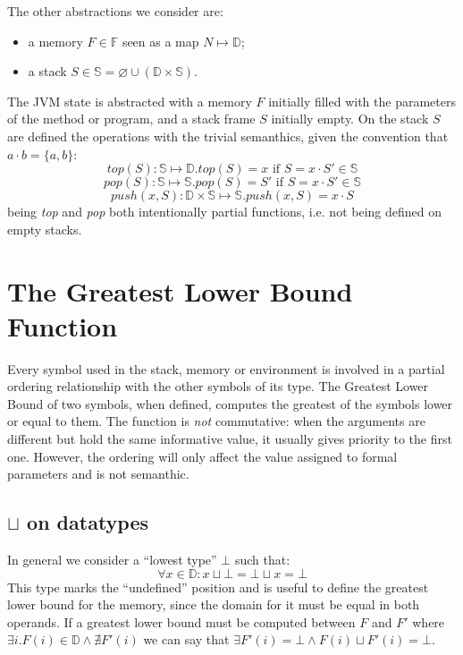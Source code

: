 \documentclass{amsart}
\newcommand{\bF}{\mathbb{F}}
\newcommand{\bS}{\mathbb{S}}
\newcommand{\data}{\mathbb{D}}
\renewcommand{\emptyset}{\varnothing}
\numberwithin{equation}{section}
\theoremstyle{plain} %
\theoremstyle{definition}
\theoremstyle{remark}
\begin{document}
The other abstractions we consider are:
\begin{itemize}
\item a memory $F \in \bF{}$ seen as a map $N \mapsto \data{}$;
\item a stack $S \in \bS{} = \emptyset \cup (\data{} \times \bS{})$. 
\end{itemize}
The JVM state is abstracted with a memory $F$ initially filled with the parameters of the method or program, and a stack frame $S$ initially empty. On the stack $S$ are defined the operations with the trivial semanthics, given the convention that $a\cdot b = \{a, b\} $:
\[
top(S): \bS{} \mapsto \data{}.top(S) = x \text{ if } S = x \cdot S' \in \bS{}
\]\[pop(S): \bS{} \mapsto \bS{}.pop(S) = S' \text{ if } S = x \cdot S' \in \bS{}
\]\[push(x, S): \data{} \times \bS{} \mapsto \bS{}.push(x, S) = x \cdot S
\]
being \emph{top} and \emph{pop} both intentionally partial functions, i.e. not being defined on empty stacks.\\


\section{The Greatest Lower Bound Function}

Every symbol used in the stack, memory or environment is involved in a partial ordering relationship with the other symbols of its type. The Greatest Lower Bound of two symbols, when defined, computes the greatest of the symbols lower or equal to them. The function is \emph{not} commutative: when the arguments are different but hold the same informative value, it usually gives priority to the first one. However, the ordering will only affect the value assigned to formal parameters and is not semanthic.

\subsection{$\sqcup$ on datatypes}
In general we consider a ``lowest type'' $\bot$ such that:
\[ \forall x \in \data{}: x \sqcup \bot = \bot \sqcup x = \bot \]
This type marks the ``undefined'' position and is useful to define the greatest lower bound for the memory, since the domain for it must be equal in both operands. If a greatest lower bound must be computed between $F$ and $F'$ where $\exists i. F(i) \in \data{} \wedge \nexists F'(i)$ we can say that $\exists F'(i) = \bot \wedge F(i) \sqcup F'(i) = \bot$.\\
\end{document}
